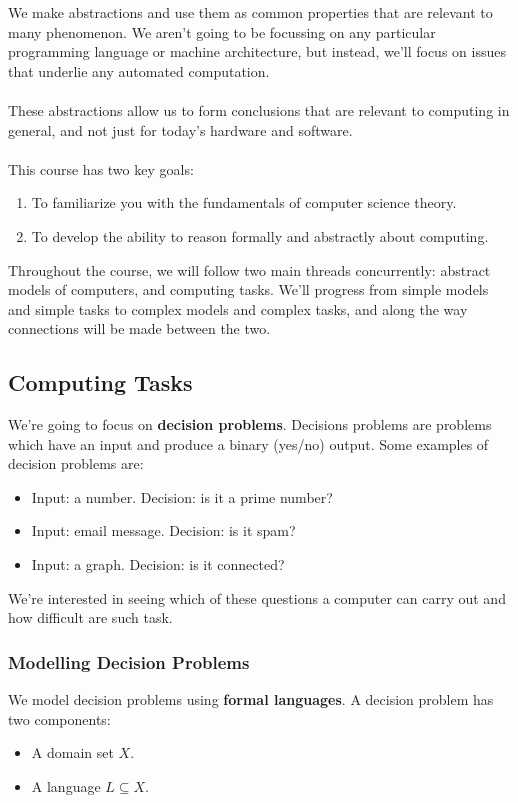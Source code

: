 \documentclass[]{article}
\theoremstyle{definition}
\begin{document}
      We make abstractions and use them as common properties that are relevant to many phenomenon. We aren't going to be focussing on any particular programming language or machine architecture, but instead, we'll focus on issues that underlie any automated computation.
      \\ \\
      These abstractions allow us to form conclusions that are relevant to computing in general, and not just for today's hardware and software.
      \\ \\
      This course has two key goals:
      \begin{enumerate}
        \item To familiarize you with the fundamentals of computer science theory.
        \item To develop the ability to reason formally and abstractly about computing.
      \end{enumerate}

    Throughout the course, we will follow two main threads concurrently: abstract models of computers, and computing tasks. We'll progress from simple models and simple tasks to complex models and complex tasks, and along the way connections will be made between the two.

    \subsection{Computing Tasks}
      We're going to focus on \textbf{decision problems}. Decisions problems are problems which have an input and produce a binary (yes/no) output. Some examples of decision problems are:
      \begin{itemize}
        \item Input: a number. Decision: is it a prime number?
        \item Input: email message. Decision: is it spam?
        \item Input: a graph. Decision: is it connected?
      \end{itemize}

      We're interested in seeing which of these questions a computer can carry out and how difficult are such task.

      \subsubsection{Modelling Decision Problems}
        We model decision problems using \textbf{formal languages}. A decision problem has two components:
        \begin{itemize}
          \item A domain set $X$.
          \item A language $L \subseteq X$.
        \end{itemize}
\end{document}
